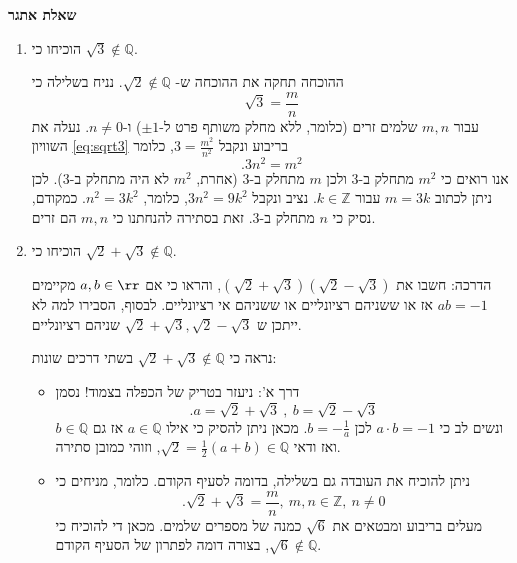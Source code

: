 {\bf
שאלת אתגר
}
\begin{enumerate}
\item
הוכיחו כי
$\sqrt{3} \notin \mathbb{Q}$.
\begin{solbox}
ההוכחה תחקה את ההוכחה ש-
$\sqrt2\notin\mathbb{Q}$.
נניח בשלילה כי
\begin{equation}\label{eq:sqrt3}
\sqrt3=\frac{m}{n}
\end{equation}
עבור
$m,n$
שלמים זרים (כלומר, ללא מחלק משותף פרט ל-$\pm1$)
ו-$n\neq0$.
נעלה את השוויון
\eqref{eq:sqrt3}
בריבוע ונקבל
$3=\frac{m^2}{n^2}$,
כלומר
$$.3n^2=m^2$$
אנו רואים כי
$m^2$
מתחלק ב-$3$
ולכן
$m$
מתחלק ב-$3$
(אחרת,
$m^2$
לא היה מתחלק ב-$3$).
לכן ניתן לכתוב
$m=3k$
עבור
$k\in\mathbb{Z}$.
נציב ונקבל
$3n^2=9k^2$,
כלומר,
$n^2=3k^2$.
כמקודם, נסיק כי
$n$
מתחלק ב-$3$.
זאת בסתירה להנחתנו כי
$m,n$
הם זרים.
\end{solbox}
\item
הוכיחו כי
$\sqrt{2} + \sqrt{3} \notin \mathbb{Q}$.

הדרכה:
חשבו את
$(\sqrt{2} + \sqrt{3})(\sqrt{2} - \sqrt{3}) $,
והראו כי אם
$a, b \in \rr$
מקיימים
$ab = -1$
אז או ששניהם רציונליים או ששניהם אי רציונליים. לבסוף, הסבירו למה לא ייתכן ש
$\sqrt{2} + \sqrt{3} , \sqrt{2} - \sqrt{3} $
שניהם רציונליים.
\begin{solbox}
נראה כי
$\sqrt2+\sqrt3\notin\mathbb{Q}$
בשתי דרכים שונות:
\begin{itemize}
\item
דרך א': ניעזר בטריק של הכפלה בצמוד! נסמן
$$.a=\sqrt2+\sqrt3\ ,\ b=\sqrt2-\sqrt3$$
ונשים לב כי
$a\cdot b=-1$
לכן
$b=-\frac1a$.
מכאן ניתן להסיק כי אילו
$a\in\mathbb{Q}$
אז גם
$b\in\mathbb{Q}$
ואז ודאי
$\sqrt2=\frac12(a+b)\in\mathbb{Q}$,
וזוהי כמובן סתירה.
\item
ניתן להוכיח את העובדה גם בשלילה, בדומה לסעיף הקודם. כלומר, מניחים כי
$$.\sqrt2+\sqrt3=\frac{m}{n},\ m,n\in\mathbb{Z},\ n\neq0$$
מעלים בריבוע ומבטאים את
$\sqrt6$
כמנה של מספרים שלמים. מכאן די להוכיח כי
$\sqrt6\notin\mathbb{Q}$,
בצורה דומה לפתרון של הסעיף הקודם.
\end{itemize}
\end{solbox}
\end{enumerate}
